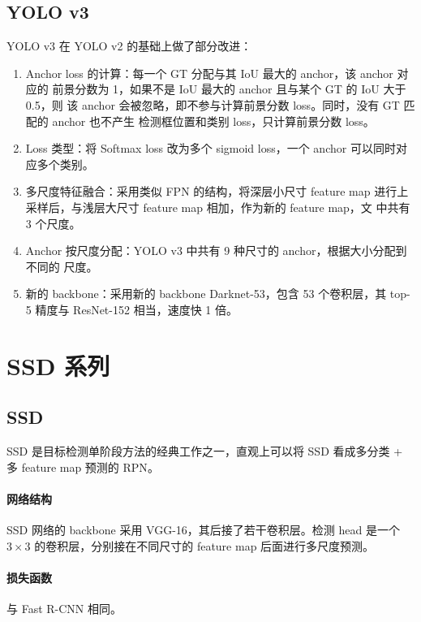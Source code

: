 \subsection{YOLO v3}\label{subsec:YOLOv3}
YOLO v3 在 YOLO v2 的基础上做了部分改进：

\begin{enumerate}
  \item Anchor loss 的计算：每一个 GT 分配与其 IoU 最大的 anchor，该 anchor 对应的
    前景分数为 1，如果不是 IoU 最大的 anchor 且与某个 GT 的 IoU 大于 0.5，则
    该 anchor 会被忽略，即不参与计算前景分数 loss。同时，没有 GT 匹配的 anchor 也不产生
    检测框位置和类别 loss，只计算前景分数 loss。
  \item Loss 类型：将 Softmax loss 改为多个 sigmoid loss，一个 anchor 可以同时对
    应多个类别。
  \item 多尺度特征融合：采用类似 FPN\cite{2016-FPN} 的结构，将深层小尺寸 feature
    map 进行上采样后，与浅层大尺寸 feature map 相加，作为新的 feature map，文
    中共有 3 个尺度。
  \item Anchor 按尺度分配：YOLO v3 中共有 9 种尺寸的 anchor，根据大小分配到不同的
    尺度。
  \item 新的 backbone：采用新的 backbone Darknet-53，包含 53 个卷积层，其 top-5
    精度与 ResNet-152 相当，速度快 1 倍。
\end{enumerate}

\section{SSD 系列}\label{sec:SSD}

\subsection{SSD}\label{subsec:SSD}

SSD 是目标检测单阶段方法的经典工作之一，直观上可以将 SSD 看成多分类 + 多 feature
map 预测的 RPN\cite{2015-SSD}。

\paragraph{网络结构}
SSD 网络的 backbone 采用 VGG-16，其后接了若干卷积层。检测 head 是一个 $3 \times
3$ 的卷积层，分别接在不同尺寸的 feature map 后面进行多尺度预测。

\paragraph{损失函数}
与 Fast R-CNN 相同。

